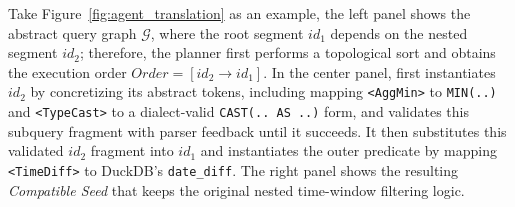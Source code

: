 \documentclass[sigconf,review,anonymous]{acmart}
\begin{document}
Take Figure~\ref{fig:agent_translation} as an example, the left panel shows the abstract query graph $\mathcal{G}$, where the root segment $id_1$ depends on the nested segment $id_2$; therefore, the planner first performs a topological sort and obtains the execution order $Order=[id_2 \rightarrow id_1]$. 
In the center panel, \tool{} first instantiates $id_2$ by concretizing its abstract tokens, including mapping \texttt{<AggMin>} to \texttt{MIN(..)} and \texttt{<TypeCast>} to a dialect-valid \texttt{CAST(.. AS ..)} form, and validates this subquery fragment with parser feedback until it succeeds. 
It then substitutes this validated $id_2$ fragment into $id_1$ and instantiates the outer predicate by mapping \texttt{<TimeDiff>} to DuckDB's \texttt{date\_diff}. The right panel shows the resulting \textit{Compatible Seed} that keeps the original nested time-window filtering logic.
\end{document}
